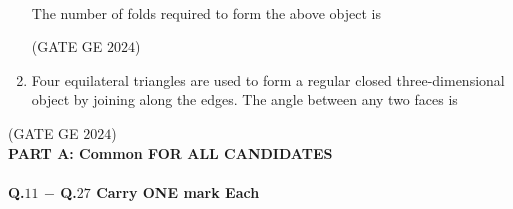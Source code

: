 \documentclass[journal,12pt,onecolumn]{IEEEtran}
\theoremstyle{remark}
\begin{document}
\begin{enumerate}
\begin{figure}[h!]
\end{figure}
\textit{} \\
The number of folds required to form the above object is
\begin{enumerate}
\end{enumerate}
\hfill{(GATE GE $2024$)}
\bigskip
\item Four equilateral triangles are used to form a regular closed three-dimensional object by joining along the edges.
The angle between any two faces is
\begin{enumerate}
\end{enumerate}
\end{enumerate}
\hfill{(GATE GE $2024$)}
\bigskip
\\
\textbf{PART A: Common FOR ALL CANDIDATES}\\
\\
\textbf{Q.$11$ $-$ Q.$27$ Carry ONE mark Each}\\
\end{document}
